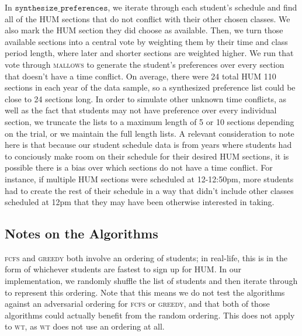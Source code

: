 In $\texttt{synthesize\_preferences}$, we iterate through each student’s schedule and find
all of the HUM sections that do not conflict with their other chosen classes. We
also mark the HUM section they did choose as available. Then, we turn those available
sections into a central vote by weighting them by their time and class period
length, where later and shorter sections are weighted higher. We run that vote through
\textsc{mallows} to generate the student’s preferences over every section that doesn't
have a time conflict. On average, there were 24 total HUM 110
sections in each year of the data sample, so a synthesized preference list could
be close to 24 sections long. In order to simulate other unknown time
conflicts, as well as the fact that students may not have preference over every
individual section, we truncate the lists to a maximum length of 5 or 10
sections depending on the trial, or we maintain the full length lists. 
A relevant consideration to note here is that because our student schedule data
is from years where students had to conciously make room on their schedule for
their desired HUM sections, it is possible there is a bias over which sections do not have a
time conflict. For instance, if multiple HUM sections were scheduled at 12-12:50pm, more
students had to create the rest of their schedule in a way that didn't include
other classes scheduled at 12pm that they may have been otherwise interested in taking. 

\subsection{Notes on the Algorithms}

\textsc{fcfs} and \textsc{greedy} both involve an ordering of students; in
real-life, this is in the form of whichever students are fastest to sign up for
HUM. In our implementation, we randomly shuffle the list of students and then
iterate through to represent this ordering. Note that this means we do not test
the algorithms against an adversarial ordering for \textsc{fcfs} or
\textsc{greedy}, and that both of those algorithms could actually benefit from the
random ordering. This does not apply to \textsc{wt}, as \textsc{wt} does not use
an ordering at all. 

